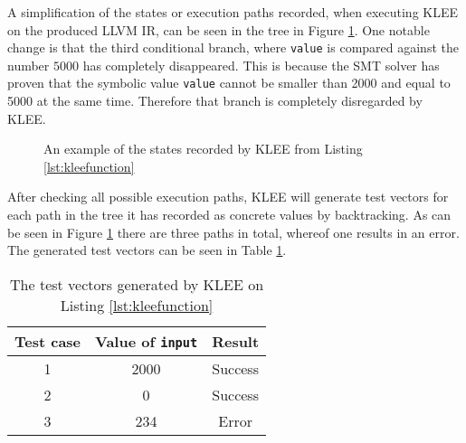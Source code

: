 A simplification of the states or execution paths recorded, when executing KLEE
on the produced LLVM IR, can be seen in the tree in Figure
\ref{figure:kleetree}.  One notable change is that the third conditional
branch, where \texttt{value} is compared against the number $5000$ has
completely disappeared. This is because the SMT solver has proven that the
symbolic value \texttt{value} cannot be smaller than 2000 and equal to 5000 at
the same time.  Therefore that branch is completely disregarded by KLEE.
\begin{figure}[h]
    \centering
    \caption{An example of the states recorded by KLEE from Listing \ref{lst:kleefunction}}
    \label{figure:kleetree}
\end{figure}
After checking all possible execution paths, KLEE will generate test vectors
for each path in the tree it has recorded as concrete values by backtracking.
As can be seen in Figure \ref{figure:kleetree} there are three paths in total,
whereof one results in an error. The generated test vectors can be seen in Table
\ref{tab:kleeexample}.

\begin{table}[h]
    \centering
    \begin{tabular}{||c c c||}
        \hline
        Test case & Value of \texttt{input} & Result \\ [0.5ex]
        \hline\hline
        1 & 2000 & Success\\
        \hline
        2 & 0 & Success \\
        \hline
        3 & 234 & Error \\
        \hline
    \end{tabular}
    \caption{The test vectors generated by KLEE on Listing \ref{lst:kleefunction}}
    \label{tab:kleeexample}
\end{table}

